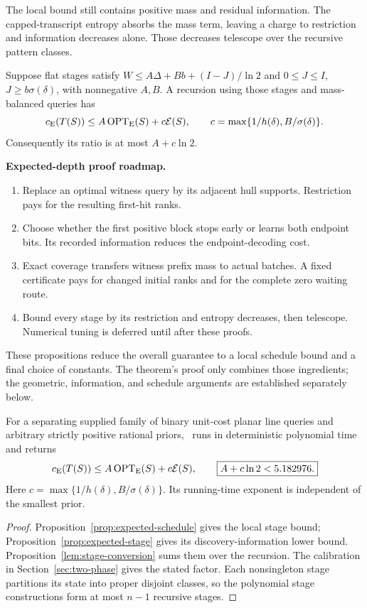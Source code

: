 The local bound still contains positive mass and residual
information. The capped-transcript entropy absorbs the mass term,
leaving a charge to restriction and information decreases alone.
Those decreases telescope over the recursive pattern classes.
\begin{proposition}\label{lem:stage-conversion}
Suppose flat stages satisfy
$W\le A\Delta+Bb+(I-J)/\ln2$ and $0\le J\le I$,
$J\ge b\sigma(\delta)$, with nonnegative $A,B$.
A recursion using those stages and mass-balanced queries has
\[
 c_{\mathrm E}(T(S))\le A\operatorname{OPT}_{\mathrm E}(S)+c\mathcal E(S),
 \qquad c=\max\{1/h(\delta),B/\sigma(\delta)\}.
\]
Consequently its ratio is at most $A+c\ln2$.
\end{proposition}

\begin{proofstrategy}
\textbf{Expected-depth proof roadmap.}
\begin{enumerate}
\item Replace an optimal witness query by its adjacent hull supports.
      Restriction pays for the resulting first-hit ranks.
\item Choose whether the first positive block stops early or learns
      both endpoint bits. Its recorded information reduces the
      endpoint-decoding cost.
\item Exact coverage transfers witness prefix mass to actual batches.
      A fixed certificate pays for changed initial ranks and for
      the complete zero waiting route.
\item Bound every stage by its restriction and entropy decreases,
      then telescope. Numerical tuning is deferred until after these proofs.
\end{enumerate}
\end{proofstrategy}

These propositions reduce the overall guarantee to a local schedule
bound and a final choice of constants. The theorem's proof only
combines those ingredients; the geometric, information, and
schedule arguments are established separately below.
\begin{theorem}
\label{thm:two-phase-expected}
For a separating supplied family of binary unit-cost planar line
queries and arbitrary strictly positive rational priors,
\ExpectedTree\ runs in deterministic polynomial time and returns
\[
 c_{\mathrm E}(T(S))\le A\operatorname{OPT}_{\mathrm E}(S)+c\mathcal E(S),
 \qquad \boxed{A+c\ln2<5.182976.}
\]
Here $c=\max\{1/h(\delta),B/\sigma(\delta)\}$.
Its running-time exponent is independent of the smallest prior.
\end{theorem}
\begin{proof}
Proposition~\ref{prop:expected-schedule} gives the local stage bound;
Proposition~\ref{prop:expected-stage} gives its discovery-information
lower bound. Proposition~\ref{lem:stage-conversion} sums them over the
recursion. The calibration in Section~\ref{sec:two-phase} gives the
stated factor. Each nonsingleton stage partitions its state into
proper disjoint classes, so the polynomial stage constructions form
at most $n-1$ recursive stages.
\end{proof}

